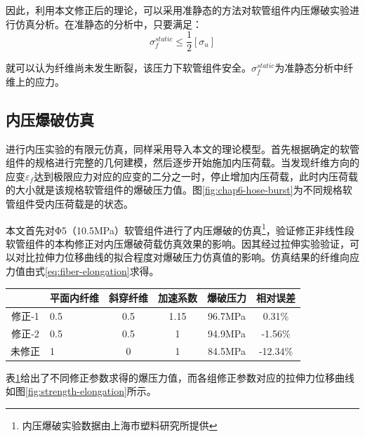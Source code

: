 因此，利用本文修正后的理论，可以采用准静态的方法对软管组件内压爆破实验进行仿真分析。在准静态的分析中，只要满足：
\begin{equation}
{\sigma _f^{static}}  \le \frac{1}{2} \left[ {{\sigma _u}} \right]
\end{equation}

就可以认为纤维尚未发生断裂，该压力下软管组件安全。$ {\sigma _f^{static}} $为准静态分析中纤维上的应力。


\subsection{内压爆破仿真}

进行内压实验的有限元仿真，同样采用\uma 导入本文的理论模型。首先根据确定的软管组件的规格进行完整的几何建模，然后逐步开始施加内压荷载。当发现纤维方向的应变$ \varepsilon_f $达到极限应力对应的应变的二分之一时，停止增加内压荷载，此时内压荷载的大小就是该规格软管组件的爆破压力值。图\ref{fig:chap6-hose-burst}为不同规格软管组件受内压荷载是的状态。



本文首先对Φ5（10.5MPa）软管组件进行了内压爆破的仿真\footnote{内压爆破实验数据由上海市塑料研究所提供}，验证修正非线性段软管组件的本构修正对内压爆破荷载仿真效果的影响。因其经过拉伸实验验证，可以对比拉伸力位移曲线的拟合程度对爆破压力仿真值的影响。仿真结果的纤维向应力值由式\ref{eq:fiber-elongation}求得。


\begin{table}[!htbp]
	\centering
	\label{tab:strength-of-hose-results}
	\begin{tabular}{@{\extracolsep{\fill}}>{\hspace{0.5cm}}clcccc}
		\toprule
		&平面内纤维&斜穿纤维&加速系数&爆破压力&相对误差\\\midrule
		修正-1&0.5&0.5&1.15&96.7MPa&0.31\%\\
		修正-2&0.5&0.5&1&94.9MPa&-1.56\%\\
		未修正&1&0&1&84.5MPa&-12.34\%\\
		\bottomrule
	\end{tabular} 
\end{table}  


表\ref{tab:strength-of-hose-results}给出了不同修正参数求得的爆压力值，而各组修正参数对应的拉伸力位移曲线如图\ref{fig:strength-elongation}所示。


